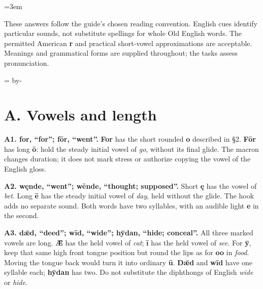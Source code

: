 \BookRecto
\begingroup
\renewcommand{\runningtitle}{Pronunciation key}
\emergencystretch=3em
\newcommand{\reserve}[1]{\par\penalty-100\begingroup\dimen0=\pagegoal\advance\dimen0 by-\pagetotal\ifdim\dimen0<#1\newpage\fi\endgroup}
\newcommand{\itempara}[2]{\par\addvspace{3pt}\begingroup\raggedright\noindent\hangindent=1.8em\hangafter=1\makebox[1.8em][l]{#1.}#2\par\endgroup}

\raggedright
{}

These answers follow the guide's chosen reading convention. English cues identify particular sounds, not substitute spellings for whole Old English words. The permitted American \textbf{r} and practical short-vowel approximations are acceptable. Meanings and grammatical forms are supplied throughout; the tasks assess pronunciation.

\reserve{4\baselineskip}
\section*{A. Vowels and length}

\textbf{A1. for, “for”; fōr, “went”.} \textbf{For} has the short rounded \textbf{o} described in §2. \textbf{Fōr} has long \textbf{ō}: hold the steady initial vowel of \emph{go}, without its final glide. The macron changes duration; it does not mark stress or authorize copying the vowel of the English gloss.

\textbf{A2. węnde, “went”; wēnde, “thought; supposed”.} Short \textbf{ę} has the vowel of \emph{bet}. Long \textbf{ē} has the steady initial vowel of \emph{day}, held without the glide. The hook adds no separate sound. Both words have two syllables, with an audible light \textbf{e} in the second.

\textbf{A3. dǣd, “deed”; wīd, “wide”; hȳdan, “hide; conceal”.} All three marked vowels are long. \textbf{Ǣ} has the held vowel of \emph{cat}; \textbf{ī} has the held vowel of \emph{see}. For \textbf{ȳ}, keep that same high front tongue position but round the lips as for \textbf{oo} in \emph{food}. Moving the tongue back would turn it into ordinary \textbf{ū}. \textbf{Dǣd} and \textbf{wīd} have one syllable each; \textbf{hȳdan} has two. Do not substitute the diphthongs of English \emph{wide} or \emph{hide}.

